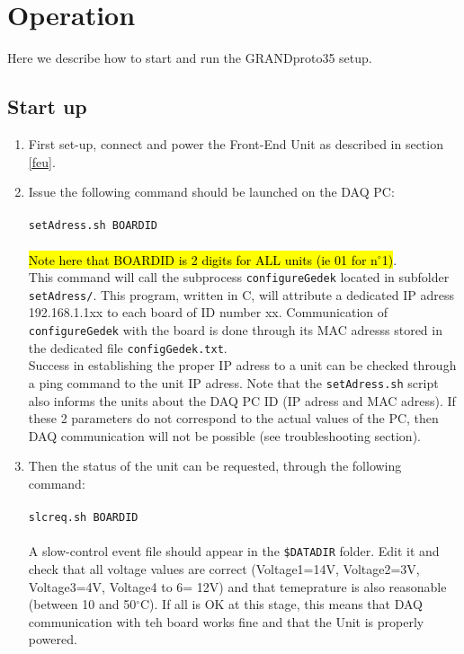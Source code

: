 \section{Operation} 

Here we describe how to start and run the GRANDproto35 setup.

\subsection{Start up}
\label{startup}
\begin{enumerate}[-]
\item{ First set-up, connect and power the Front-End Unit as described in section \ref{feu}.} 
%
\item{Issue the following command should be launched on the DAQ PC: \\
\ \\
\texttt{setAdress.sh BOARDID} \\
\ \\
\hl{Note here that BOARDID is 2 digits for ALL units (ie 01 for n$^{\circ}$1)}. \\
This command will call the subprocess \texttt{configureGedek} located in subfolder \texttt{setAdress/}. This program, written in C, will attribute a dedicated IP adress 192.168.1.1xx to each board of ID number xx. Communication of \texttt{configureGedek} with the board is done through its MAC adresss stored in the dedicated file \texttt{configGedek.txt}. \\
Success in establishing the proper IP adress to a unit can be checked through a ping command to the unit IP adress. Note that the \texttt{setAdress.sh} script also informs the units about the DAQ PC ID (IP adress and MAC adress). If these 2 parameters do not correspond to the actual values of the PC, then DAQ communication will not be possible (see troubleshooting section).}
%
\item{Then the status of the unit can be requested, through the following command: \\
\ \\
\texttt{slcreq.sh  BOARDID }\\
\ \\
A slow-control event file should appear in the \texttt{\$DATADIR} folder. Edit it and check that all voltage values are correct (Voltage1=14V, Voltage2=3V, Voltage3=4V, Voltage4 to 6= 12V) and that temeprature is also reasonable (between 10 and 50$^{\circ}$C).  If all is OK at this stage, this means that DAQ communication with teh board works fine and that the Unit is properly powered.}

\end{enumerate}
